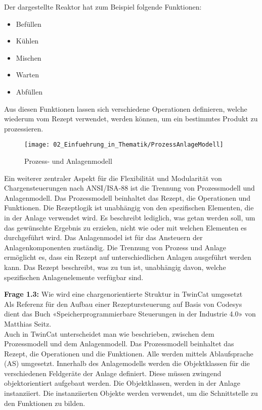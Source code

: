 		Der dargestellte Reaktor hat zum Beispiel folgende Funktionen:
		\begin{itemize}
			\item Befüllen
			\item Kühlen
			\item Mischen
			\item Warten
			\item Abfüllen
		\end{itemize}
		\addvspace{5mm} 
		
		Aus diesen Funktionen lassen sich verschiedene Operationen definieren, welche wiederum vom Rezept verwendet, werden können, um ein bestimmtes Produkt zu prozessieren. 
		\begin{wrapfigure}{r}{0.5\textwidth}
			\centering
			\texttt{[image: 02\_Einfuehrung\_in\_Thematik/ProzessAnlageModell]}
			\captionsetup{justification=centering}
			\caption{Prozess- und Anlagenmodell}
			\label{fig:ProzessAnlageModell}
		\end{wrapfigure}
		Ein weiterer zentraler Aspekt für die Flexibilität und Modularität von Chargensteuerungen nach ANSI/ISA-88 ist die Trennung von Prozessmodell und Anlagenmodell. Das Prozessmodell beinhaltet das Rezept, die Operationen und Funktionen. Die Rezeptlogik ist unabhängig von den spezifischen Elementen, die in der Anlage verwendet wird. Es beschreibt lediglich, was getan werden soll, um das gewünschte Ergebnis zu erzielen, nicht wie oder mit welchen Elementen es durchgeführt wird. Das Anlagenmodel ist für das Ansteuern der Anlagenkomponenten zuständig. Die Trennung von Prozess und Anlage ermöglicht es, dass ein Rezept auf unterschiedlichen Anlagen ausgeführt werden kann. Das Rezept beschreibt, was zu tun ist, unabhängig davon, welche spezifischen Anlagenelemente verfügbar sind.
		
	\vspace{3mm}
	
	\textbf{Frage 1.3:} Wie wird eine chargenorientierte Struktur in TwinCat umgesetzt \vspace{2mm} 
	\\
		Als Referenz für den Aufbau einer Rezeptursteuerung auf Basis von Codesys dient das Buch «Speicherprogrammierbare Steuerungen in der Industrie 4.0» von Matthias Seitz.
		\\
		Auch in TwinCat unterscheidet man wie beschrieben, zwischen dem Prozessmodell und dem Anlagenmodell. Das Prozessmodell beinhaltet das Rezept, die Operationen und die Funktionen. Alle werden mittels Ablaufsprache (AS) umgesetzt. Innerhalb des Anlagemodells werden die Objektklassen für die verschiedenen Feldgeräte der Anlage definiert. Diese müssen zwingend objektorientiert aufgebaut werden. Die Objektklassen, werden in der Anlage instanziiert. Die instanziierten Objekte werden verwendet, um die Schnittstelle zu den Funktionen zu bilden. 
		
